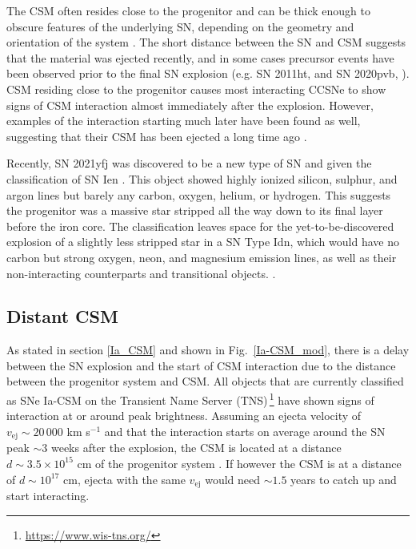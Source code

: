 \documentclass[a4paper,oneside,12pt, class=Latex/Classes/PhDthesisPSnPDF, crop=false]{standalone}
\begin{document}
The CSM often resides close to the progenitor and can be thick enough to obscure features of the underlying SN, depending on the geometry and orientation of the system \citep{1994W, PTF11iqb}. The short distance between the SN and CSM suggests that the material was ejected recently, and in some cases precursor events have been observed prior to the final SN explosion (e.g. SN 2011ht, \citealt{2011ht} and SN 2020pvb, \citealt{2020pvb}). CSM residing close to the progenitor causes most interacting CCSNe to show signs of CSM interaction almost immediately after the explosion. However, examples of the interaction starting much later have been found as well, suggesting that their CSM has been ejected a long time ago \citep{2008iy, late-CSM_IIn_Spitzer}.

Recently, SN 2021yfj was discovered to be a new type of SN and given the classification of SN Ien \citep{Ien_class}. This object showed highly ionized silicon, sulphur, and argon lines but barely any carbon, oxygen, helium, or hydrogen. This suggests the progenitor was a massive star stripped all the way down to its final layer before the iron core. The classification leaves space for the yet-to-be-discovered explosion of a slightly less stripped star in a SN Type Idn, which would have no carbon but strong oxygen, neon, and magnesium emission lines, as well as their non-interacting counterparts and transitional objects. \citep{Ien_disc}.\\


\subsection{Distant CSM}
As stated in section \ref{Ia_CSM} and shown in Fig.~\ref{Ia-CSM_mod}, there is a delay between the SN explosion and the start of CSM interaction due to the distance between the progenitor system and CSM. All objects that are currently classified as SNe Ia-CSM on the Transient Name Server (TNS)\,\footnote{\url{https://www.wis-tns.org/}} have shown signs of interaction at or around peak brightness. Assuming an ejecta velocity of $v_\text{ej} \sim 20\,000$ km s$^{-1}$ and that the interaction starts on average around the SN peak $\sim3$ weeks after the explosion, the CSM is located at a distance $d\sim3.5\times10^{15}$ cm of the progenitor system \citep{Ia-CSM_BTS}. If however the CSM is at a distance of $d\sim10^{17}$ cm, ejecta with the same $v_\text{ej}$ would need $\sim1.5$ years to catch up and start interacting.
\end{document}
